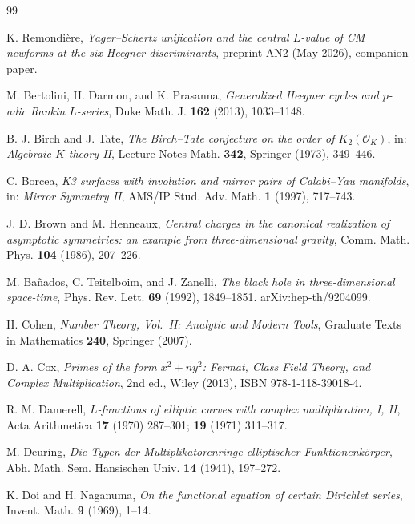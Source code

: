 \documentclass[11pt,a4paper]{amsart}
\theoremstyle{definition}
\newcommand{\OK}{\mathcal{O}_K}
\begin{document}

\begin{thebibliography}{99}

 K. Remondi\`ere, \emph{Yager--Schertz unification and the central $L$-value of CM newforms at the six Heegner discriminants}, preprint AN2 (May 2026), companion paper.

 M. Bertolini, H. Darmon, and K. Prasanna, \emph{Generalized Heegner cycles and $p$-adic Rankin $L$-series}, Duke Math. J. \textbf{162} (2013), 1033--1148.

 B. J. Birch and J. Tate, \emph{The Birch--Tate conjecture on the order of $K_2(\OK)$}, in: \emph{Algebraic $K$-theory II}, Lecture Notes Math. \textbf{342}, Springer (1973), 349--446.

 C. Borcea, \emph{K3 surfaces with involution and mirror pairs of Calabi--Yau manifolds}, in: \emph{Mirror Symmetry II}, AMS/IP Stud. Adv. Math. \textbf{1} (1997), 717--743.

 J. D. Brown and M. Henneaux, \emph{Central charges in the canonical realization of asymptotic symmetries: an example from three-dimensional gravity}, Comm. Math. Phys. \textbf{104} (1986), 207--226.

 M. Ba\~nados, C. Teitelboim, and J. Zanelli, \emph{The black hole in three-dimensional space-time}, Phys. Rev. Lett. \textbf{69} (1992), 1849--1851. arXiv:hep-th/9204099.

 H. Cohen, \emph{Number Theory, Vol.\ II: Analytic and Modern Tools}, Graduate Texts in Mathematics \textbf{240}, Springer (2007).

 D. A. Cox, \emph{Primes of the form $x^2 + ny^2$: Fermat, Class Field Theory, and Complex Multiplication}, 2nd ed., Wiley (2013), ISBN 978-1-118-39018-4.

 R. M. Damerell, \emph{$L$-functions of elliptic curves with complex multiplication, I, II}, Acta Arithmetica \textbf{17} (1970) 287--301; \textbf{19} (1971) 311--317.

 M. Deuring, \emph{Die Typen der Multiplikatorenringe elliptischer Funktionenk\"orper}, Abh. Math. Sem. Hansischen Univ. \textbf{14} (1941), 197--272.

 K. Doi and H. Naganuma, \emph{On the functional equation of certain Dirichlet series}, Invent. Math. \textbf{9} (1969), 1--14.


\end{thebibliography}
\end{document}
